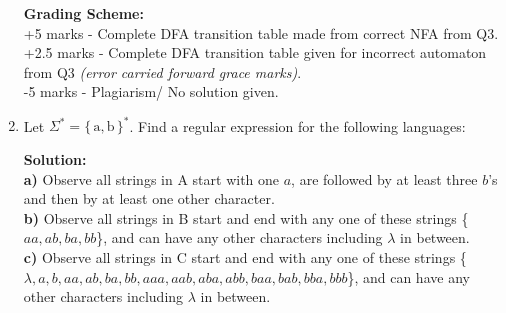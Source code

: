 \documentclass[11pt, article, oneside]{memoir}
\newcommand{\set}[1]{\{\, #1\, \}}
\DeclarePairedDelimiter\abs{\lvert}{\rvert}
\begin{document}
\begin{enumerate}
        \textbf{Grading Scheme:}
        \\+5 marks - Complete DFA transition table made from correct NFA from Q3.
        \\+2.5 marks - Complete DFA transition table given for incorrect automaton from Q3 \textit{(error carried forward grace marks)}.
        \\-5 marks -  Plagiarism/ No solution given.
        
    \item
        Let \(\Sigma^* = \set{\text{a}, \text{b}}^*\). Find a regular expression for the following languages:

        \textbf{Solution:}
        \\\textbf{a)} Observe all strings in A start with one \(a\), are followed by at least three \(b\)'s and then by at least one other character.
        \\\textbf{b)} Observe all strings in B start and end with any one of these strings \{\(aa, ab, ba, bb\)\}, and can have any other characters including \(\lambda\) in between.
        \\\textbf{c)} Observe all strings in C start and end with any one of these strings \{\(\lambda, a, b, aa, ab, ba, bb, aaa, aab, aba, abb, baa, bab, bba, bbb\)\}, and can have any other characters including \(\lambda\) in between.


\end{enumerate}
\end{document}
